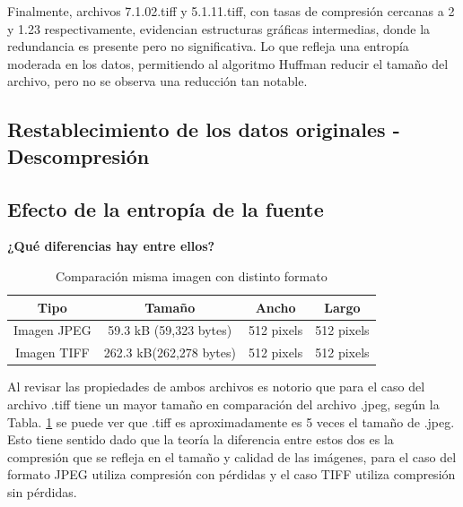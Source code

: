 \documentclass[conference,onecolumn,12pt]{IEEEtran}
\numberwithin{equation}{subsection}
\begin{document}
Finalmente, archivos 7.1.02.tiff y 5.1.11.tiff, con tasas de compresión cercanas a 2 y 1.23 respectivamente, evidencian estructuras gráficas intermedias, donde la redundancia es presente pero no significativa. Lo que refleja una entropía moderada en los datos, permitiendo al algoritmo Huffman reducir el tamaño del archivo, pero no se observa una reducción tan notable.









\subsection{Restablecimiento de los datos originales - Descompresión}














\subsection{Efecto de la entropía de la fuente}
\textbf{¿Qué diferencias hay entre ellos? }

\begin{table}[h!]
    \centering
    \caption{Comparación misma imagen con distinto formato }
    \label{tab:jpeg_vs_tiff}
    \begin{tabular}{cccc}
    \toprule
    \textbf{Tipo} & \textbf{Tamaño} & \textbf{Ancho} & \textbf{Largo} \\
    \midrule
    Imagen JPEG & 59.3 kB (59,323 bytes) & 512 pixels & 512 pixels \\
    Imagen TIFF & 262.3 kB(262,278 bytes)& 512 pixels & 512 pixels \\
    \bottomrule
    \end{tabular}
\end{table}


Al revisar las propiedades de ambos  archivos es notorio que para el caso del archivo .tiff tiene un mayor tamaño en comparación del archivo .jpeg, según la Tabla. \ref{tab:jpeg_vs_tiff}  se puede ver que .tiff es aproximadamente es 5 veces el tamaño de .jpeg. Esto tiene sentido dado que la teoría la diferencia entre estos dos es la compresión que se refleja en el tamaño y calidad de las imágenes, para el caso del formato JPEG utiliza compresión con pérdidas y el caso TIFF utiliza compresión sin pérdidas.
\end{document}
